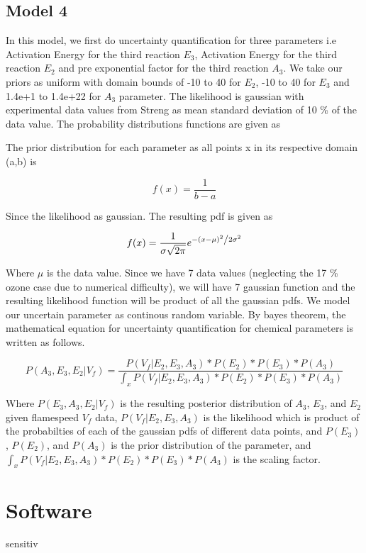 \subsection{Model 4}


\noindent In this model, we first do uncertainty quantification for three parameters i.e Activation Energy for the third reaction $E_3$, Activation Energy for the third reaction $E_2$  and pre exponential factor for the third reaction $A_3$. We take our priors as uniform with domain bounds of -10 to 40 for $E_2$, -10 to 40 for $E_3$  and 1.4e+1 to 1.4e+22 for $A_3$  parameter. The likelihood is gaussian with experimental data values from Streng\cite{Streng} as mean standard deviation of 10 \% of the data value. The probability distributions functions are given as

\noindent The prior distribution for each parameter as all points x in its respective domain (a,b) is 

$$f(x) = \frac{1}{b -a}$$


\noindent Since the likelihood as gaussian. The resulting pdf is given as 

$$f(x) = \frac{1}{{\sigma \sqrt {2\pi } }}e^{{{ - \left( {x - \mu } \right)^2 } \mathord{\left/ {\vphantom {{ - \left( {x - \mu } \right)^2 } {2\sigma ^2 }}} \right. \kern-\nulldelimiterspace} {2\sigma ^2 }}} $$

  
\noindent Where $\mu$ is the data value. Since we have 7 data values (neglecting the 17 \% ozone case due to numerical difficulty), we will have 7 gaussian function and the resulting likelihood function will be product of all the gaussian pdfs. We model our uncertain parameter as continous random variable. By bayes theorem, the mathematical equation for uncertainty quantification for chemical parameters is written as follows. 

 $$P( A_3, E_3,E_2 |V_f ) = \frac{P(V_f| E_2,E_3,A_3)* P(E_2)*P(E_3)* P(A_3)}{\int_x P(V_f|E_2,E_3,A_3)* P(E_2)*P(E_3)*P(A_3)}$$ 
 
 \noindent Where  $P(E_3,A_3,E_2 |V_f)$ is the resulting posterior distribution of $A_3$, $E_3$,  and $E_2$ given flamespeed $V_f$ data, $P(V_f| E_2, E_3 ,A_3)$ is the likelihood which is product of the probabilties of each of the gaussian pdfs of different data points, and $P(E_3)$, $P(E_2)$, and $P(A_3)$ is the prior distribution of the parameter, and $\int_x P(V_f|E_2,E_3,A_3)* P(E_2)*P(E_3)*P(A_3)$ is the scaling factor.


\section{Software} sensitiv
